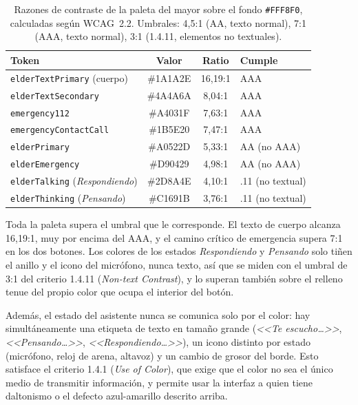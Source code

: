 \begin{table}[htbp]
    \centering
    \caption{Razones de contraste de la paleta del mayor sobre el fondo \texttt{\#FFF8F0}, calculadas según WCAG~2.2. Umbrales: 4{,}5:1 (AA, texto normal), 7:1 (AAA, texto normal), 3:1 (1.4.11, elementos no textuales).}
    \label{tab:contraste}
    \begin{tabularx}{\textwidth}{@{}>{\RaggedRight\arraybackslash}X c c >{\RaggedRight\arraybackslash}X@{}}
        \toprule
        \textbf{Token} & \textbf{Valor} & \textbf{Ratio} & \textbf{Cumple} \\
        \midrule
        \texttt{elderTextPrimary} (cuerpo)    & \#1A1A2E & 16{,}19:1 & AAA \\
        \texttt{elderTextSecondary}            & \#4A4A6A & 8{,}04:1  & AAA \\
        \texttt{emergency112}                  & \#A4031F & 7{,}63:1  & AAA \\
        \texttt{emergencyContactCall}          & \#1B5E20 & 7{,}47:1  & AAA \\
        \texttt{elderPrimary}                  & \#A0522D & 5{,}33:1  & AA (no AAA) \\
        \texttt{elderEmergency}                & \#D90429 & 4{,}98:1  & AA (no AAA) \\
        \texttt{elderTalking} (\emph{Respondiendo}) & \#2D8A4E & 4{,}10:1  & 1.4.11 (no textual) \\
        \texttt{elderThinking} (\emph{Pensando})    & \#C1691B & 3{,}76:1  & 1.4.11 (no textual) \\
        \bottomrule
    \end{tabularx}

\end{table}

Toda la paleta supera el umbral que le corresponde. El texto de cuerpo alcanza 16{,}19:1, muy por encima del AAA, y el camino crítico de emergencia supera 7:1 en los dos botones. Los colores de los estados \emph{Respondiendo} y \emph{Pensando} solo tiñen el anillo y el icono del micrófono, nunca texto, así que se miden con el umbral de 3:1 del criterio 1.4.11 (\emph{Non-text Contrast}), y lo superan también sobre el relleno tenue del propio color que ocupa el interior del botón.

Además, el estado del asistente nunca se comunica solo por el color: hay simultáneamente una etiqueta de texto en tamaño grande (\emph{<<Te escucho\ldots>>}, \emph{<<Pensando\ldots>>}, \emph{<<Respondiendo\ldots>>}), un icono distinto por estado (micrófono, reloj de arena, altavoz) y un cambio de grosor del borde. Esto satisface el criterio 1.4.1 (\emph{Use of Color}), que exige que el color no sea el único medio de transmitir información, y permite usar la interfaz a quien tiene daltonismo o el defecto azul-amarillo descrito arriba.

